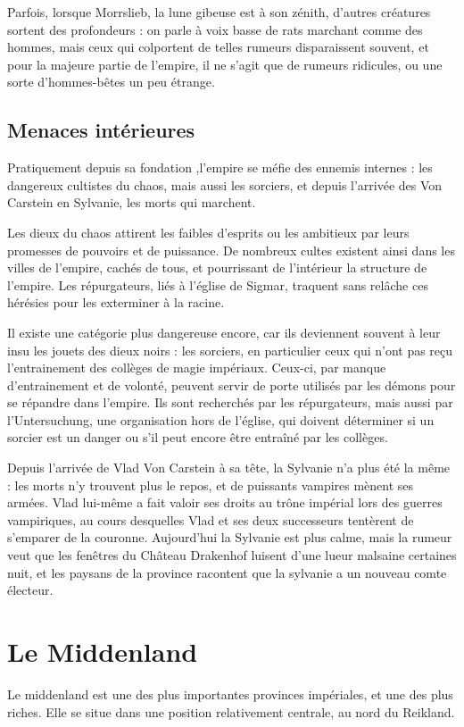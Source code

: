 \documentclass[10pt,a4paper]{book}
\begin{document}
Parfois, lorsque Morrslieb, la lune gibeuse est à son zénith, d'autres créatures sortent des profondeurs : on parle à voix basse de rats marchant comme des hommes, mais ceux qui colportent de telles rumeurs disparaissent souvent, et pour la majeure partie de l'empire, il ne s'agit que de rumeurs ridicules, ou une sorte d'hommes-bêtes un peu étrange.


\section{Menaces intérieures}
Pratiquement depuis sa fondation ,l'empire se méfie des ennemis internes : les dangereux cultistes du chaos, mais aussi les sorciers, et depuis l'arrivée des Von Carstein en Sylvanie, les morts qui marchent.

Les dieux du chaos attirent les faibles d'esprits ou les ambitieux par leurs promesses de pouvoirs et de puissance. De nombreux cultes existent ainsi dans les villes de l'empire, cachés de tous, et pourrissant de l'intérieur la structure de l'empire. Les répurgateurs, liés à l'église de Sigmar, traquent sans relâche ces hérésies pour les exterminer à la racine.

Il existe une catégorie plus dangereuse encore, car ils deviennent souvent à leur insu les jouets des dieux noirs : les sorciers, en particulier ceux qui n'ont pas reçu l'entrainement des collèges de magie impériaux. Ceux-ci, par manque d'entrainement et de volonté, peuvent servir de porte utilisés par les démons pour se répandre dans l'empire. Ils sont recherchés par les répurgateurs, mais aussi par l'Untersuchung, une organisation hors de l'église, qui doivent déterminer si un sorcier est un danger ou s'il peut encore être entraîné par les collèges.

Depuis l'arrivée de Vlad Von Carstein à sa tête, la Sylvanie n'a plus été la même : les morts n'y trouvent plus le repos, et de puissants vampires mènent ses armées. Vlad lui-même a fait valoir ses droits au trône impérial lors des guerres vampiriques, au cours desquelles Vlad et ses deux successeurs tentèrent de s'emparer de la couronne. Aujourd'hui la Sylvanie est plus calme, mais la rumeur veut que les fenêtres du Château Drakenhof luisent d'une lueur malsaine certaines nuit, et les paysans de la province racontent que la sylvanie a un nouveau comte électeur.

\chapter{Le Middenland}
Le middenland est une des plus importantes provinces impériales, et une des plus riches. Elle se situe dans une position relativement centrale, au nord du Reikland.
\end{document}
